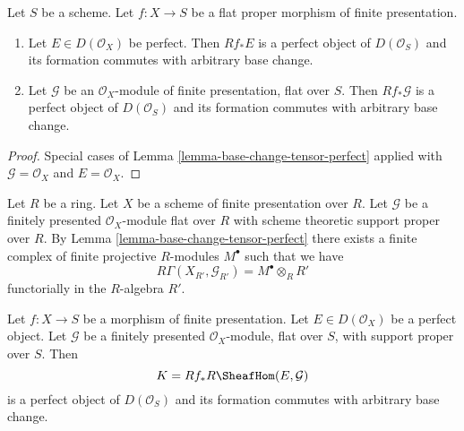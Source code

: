 \begin{lemma}
\label{lemma-flat-proper-perfect-direct-image-general}
Let $S$ be a scheme. Let $f : X \to S$ be a flat proper
morphism of finite presentation.
\begin{enumerate}
\item Let $E \in D(\mathcal{O}_X)$ be perfect. Then
$Rf_*E$ is a perfect object of $D(\mathcal{O}_S)$ and its formation
commutes with arbitrary base change.
\item Let $\mathcal{G}$ be an $\mathcal{O}_X$-module of finite presentation,
flat over $S$. Then $Rf_*\mathcal{G}$ is a perfect object of
$D(\mathcal{O}_S)$ and its formation commutes with arbitrary base change.
\end{enumerate}
\end{lemma}

\begin{proof}
Special cases of
Lemma \ref{lemma-base-change-tensor-perfect} applied with
$\mathcal{G} = \mathcal{O}_X$ and $E = \mathcal{O}_X$.
\end{proof}

\begin{remark}
\label{remark-explain-perfect-direct-image}
Let $R$ be a ring. Let $X$ be a scheme of finite presentation over
$R$. Let $\mathcal{G}$ be a finitely presented $\mathcal{O}_X$-module
flat over $R$ with scheme theoretic support proper over $R$. By
Lemma \ref{lemma-base-change-tensor-perfect}
there exists a finite complex of finite projective $R$-modules
$M^\bullet$ such that we have
$$
R\Gamma(X_{R'}, \mathcal{G}_{R'}) = M^\bullet \otimes_R R'
$$
functorially in the $R$-algebra $R'$.
\end{remark}

\begin{lemma}
\label{lemma-base-change-RHom-perfect}
Let $f : X \to S$ be a morphism of finite presentation.
Let $E \in D(\mathcal{O}_X)$ be a perfect object. Let $\mathcal{G}$ be a
finitely presented $\mathcal{O}_X$-module, flat over $S$, with support
proper over $S$. Then
$$
K = Rf_*R\SheafHom(E, \mathcal{G})
$$
is a perfect object of $D(\mathcal{O}_S)$ and its formation
commutes with arbitrary base change.
\end{lemma}

